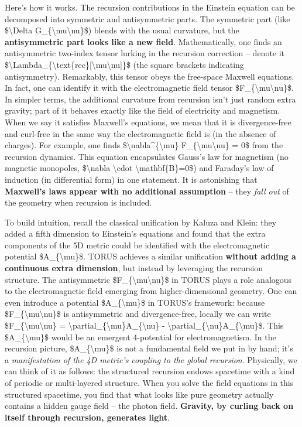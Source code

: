\documentclass[]{article}
\begin{document}
Here's how it works. The recursion contributions in the Einstein
equation can be decomposed into symmetric and antisymmetric parts. The
symmetric part (like \$\textbackslash{}Delta
G\_\{\textbackslash{}mu\textbackslash{}nu\}\$) blends with the usual
curvature, but the \textbf{antisymmetric part looks like a new field}.
Mathematically, one finds an antisymmetric two-index tensor lurking in
the recursion correction -- denote it
\$\textbackslash{}Lambda\_\{\textbackslash{}text\{rec\}{[}\textbackslash{}mu\textbackslash{}nu{]}\}\$
(the square brackets indicating antisymmetry). Remarkably, this tensor
obeys the free-space Maxwell equations. In fact, one can identify it
with the electromagnetic field tensor
\$F\_\{\textbackslash{}mu\textbackslash{}nu\}\$​. In simpler terms, the
additional curvature from recursion isn't just random extra gravity;
part of it behaves exactly like the field of electricity and magnetism.
When we say it satisfies Maxwell's equations, we mean that it is
divergence-free and curl-free in the same way the electromagnetic field
is (in the absence of charges). For example, one finds
\$\textbackslash{}nabla\^{}\{\textbackslash{}mu\}
F\_\{\textbackslash{}mu\textbackslash{}nu\} = 0\$ from the recursion
dynamics​. This equation encapsulates Gauss's law for magnetism (no
magnetic monopoles, \$\textbackslash{}nabla \textbackslash{}cdot
\textbackslash{}mathbf\{B\}=0\$) and Faraday's law of induction (in
differential form) in one statement. It is astonishing that
\textbf{Maxwell's laws appear with no additional assumption} -- they
\emph{fall out} of the geometry when recursion is included.

To build intuition, recall the classical unification by Kaluza and
Klein: they added a fifth dimension to Einstein's equations and found
that the extra components of the 5D metric could be identified with the
electromagnetic potential \$A\_\{\textbackslash{}mu\}\$. TORUS achieves
a similar unification \textbf{without adding a continuous extra
dimension}, but instead by leveraging the recursion structure. The
antisymmetric \$F\_\{\textbackslash{}mu\textbackslash{}nu\}\$ in TORUS
plays a role analogous to the electromagnetic field emerging from
higher-dimensional geometry​. One can even introduce a potential
\$A\_\{\textbackslash{}mu\}\$ in TORUS's framework: because
\$F\_\{\textbackslash{}mu\textbackslash{}nu\}\$ is antisymmetric and
divergence-free, locally we can write
\$F\_\{\textbackslash{}mu\textbackslash{}nu\} =
\textbackslash{}partial\_\{\textbackslash{}mu\}A\_\{\textbackslash{}nu\}
-
\textbackslash{}partial\_\{\textbackslash{}nu\}A\_\{\textbackslash{}mu\}\$​.
This \$A\_\{\textbackslash{}mu\}\$ would be an emergent 4-potential for
electromagnetism. In the recursion picture,
\$A\_\{\textbackslash{}mu\}\$ is not a fundamental field we put in by
hand; it's a \emph{manifestation of the 4D metric's coupling to the
global recursion}. Physically, we can think of it as follows: the
structured recursion endows spacetime with a kind of periodic or
multi-layered structure. When you solve the field equations in this
structured spacetime, you find that what looks like pure geometry
actually contains a hidden gauge field -- the photon field.
\textbf{Gravity, by curling back on itself through recursion, generates
light}.
\end{document}

